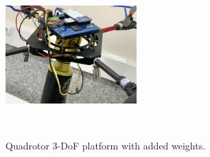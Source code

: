 \documentclass[3p]{elsarticle}
\begin{document}
\begin{figure}[H]
    \centering
    \includegraphics[width=0.45\textwidth]{../Figure/implementation/weight/Quad_with_weight.jpg}
    \caption{Quadrotor 3-DoF platform with added weights.} %
~\label{fig:quadrotor_with_weight}
    \centering
    \hfill

\end{figure}
\end{document}
